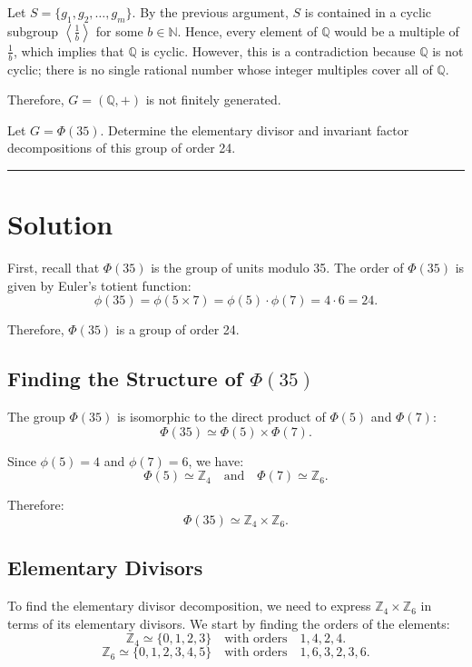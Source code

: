 \documentclass[12pt]{amsart}
\theoremstyle{definition}
\numberwithin{equation}{section}
\newcommand{\Z}{\mathbb{Z}}
\newcommand{\Q}{\mathbb{Q}}
\newcommand{\N}{\mathbb{N}}
\begin{document}
\begin{exercise}{6}
    Let \(S = \{g_1, g_2, \ldots, g_m\}\). By the previous argument, \(S\) is contained in a cyclic subgroup \(\left\langle \frac{1}{b} \right\rangle\) for some \(b \in \N\). Hence, every element of \(\Q\) would be a multiple of \(\frac{1}{b}\), which implies that \(\Q\) is cyclic. However, this is a contradiction because \(\Q\) is not cyclic; there is no single rational number whose integer multiples cover all of \(\Q\).

    Therefore, \(G = (\Q, +)\) is not finitely generated.

    
\end{exercise}
\newpage
\begin{exercise}{7} Let \(G = \Phi(35)\). Determine the elementary divisor and invariant factor decompositions of this group of order 24. 

    \noindent\rule{\linewidth}{1pt}

    \section*{Solution}

    First, recall that \(\Phi(35)\) is the group of units modulo 35. The order of \(\Phi(35)\) is given by Euler's totient function:
    \[
    \phi(35) = \phi(5 \times 7) = \phi(5) \cdot \phi(7) = 4 \cdot 6 = 24.
    \]
    
    Therefore, \(\Phi(35)\) is a group of order 24.

    \subsection*{Finding the Structure of \(\Phi(35)\)}

    The group \(\Phi(35)\) is isomorphic to the direct product of \(\Phi(5)\) and \(\Phi(7)\):
    \[
    \Phi(35) \simeq \Phi(5) \times \Phi(7).
    \]
    
    Since \(\phi(5) = 4\) and \(\phi(7) = 6\), we have:
    \[
    \Phi(5) \simeq \Z_4 \quad \text{and} \quad \Phi(7) \simeq \Z_6.
    \]
    
    Therefore:
    \[
    \Phi(35) \simeq \Z_4 \times \Z_6.
    \]

    \subsection*{Elementary Divisors}

    To find the elementary divisor decomposition, we need to express \(\Z_4 \times \Z_6\) in terms of its elementary divisors. We start by finding the orders of the elements:
    \[
    \Z_4 \simeq \{0, 1, 2, 3\} \quad \text{with orders} \quad 1, 4, 2, 4.
    \]
    \[
    \Z_6 \simeq \{0, 1, 2, 3, 4, 5\} \quad \text{with orders} \quad 1, 6, 3, 2, 3, 6.
    \]


\end{exercise}
\end{document}
